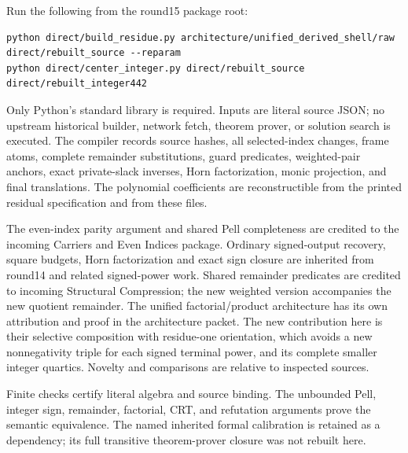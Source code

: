 Run the following from the round15 package root:



\begin{verbatim}
python direct/build_residue.py architecture/unified_derived_shell/raw direct/rebuilt_source --reparam
python direct/center_integer.py direct/rebuilt_source direct/rebuilt_integer442
\end{verbatim}

Only Python's standard library is required. Inputs are literal source JSON; no upstream historical builder, network fetch, theorem prover, or solution search is executed. The compiler records source hashes, all selected-index changes, frame atoms, complete remainder substitutions, guard predicates, weighted-pair anchors, exact private-slack inverses, Horn factorization, monic projection, and final translations. The polynomial coefficients are reconstructible from the printed residual specification and from these files.



The even-index parity argument and shared Pell completeness are credited to the incoming Carriers and Even Indices package. Ordinary signed-output recovery, square budgets, Horn factorization and exact sign closure are inherited from round14 and related signed-power work. Shared remainder predicates are credited to incoming Structural Compression; the new weighted version accompanies the new quotient remainder. The unified factorial/\allowbreak{}product architecture has its own attribution and proof in the architecture packet. The new contribution here is their selective composition with residue-one orientation, which avoids a new nonnegativity triple for each signed terminal power, and its complete smaller integer quartics. Novelty and comparisons are relative to inspected sources.



Finite checks certify literal algebra and source binding. The unbounded Pell, integer sign, remainder, factorial, CRT, and refutation arguments prove the semantic equivalence. The named inherited formal calibration is retained as a dependency; its full transitive theorem-prover closure was not rebuilt here.
